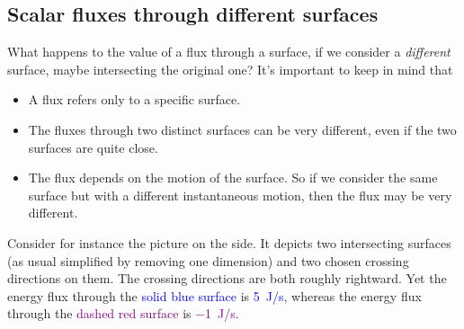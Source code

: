 \documentclass[a4paper,12pt,%
onecolumn,oneside,%
british%
]{memoir}
\renewcommand*{\|}[1][]{\nonscript\:#1\vert\nonscript\:\mathopen{}}
\begin{document}
\subsection{Scalar fluxes through different surfaces}
\label{sec:surface_change_scalar}

What happens to the value of a flux through a surface, if we consider a \emph{different} surface, maybe intersecting the original one? It's important to keep in mind that
\begin{itemize}[nosep]
\item A flux refers only to a specific surface.
\item The fluxes through two distinct surfaces can be very different, even if the two surfaces are quite close.
\item The flux depends on the motion of the surface. So if we consider the same surface but with a different instantaneous motion, then the flux may be very different.
\end{itemize}


Consider for instance the picture on the side.
%
%
It depicts two intersecting surfaces (as usual simplified by removing one dimension) and two chosen crossing directions on them. The crossing directions are both roughly rightward. Yet the energy flux through the \textcolor{blue}{solid blue surface} is \textcolor{blue}{\qty{+5}{J/s}}, whereas the energy flux through the \textcolor{purple}{dashed red surface} is \textcolor{purple}{\qty{-1}{J/s}}.
\end{document}
